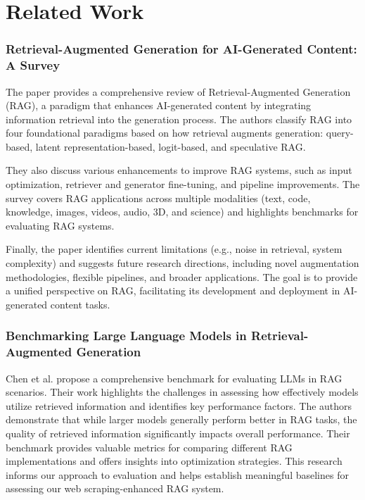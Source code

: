 \documentclass[fleqn,moreauthors,10pt]{ds_report}
\begin{document}
\textbf{}

\section*{Related Work}

\subsubsection{Retrieval-Augmented Generation for AI-Generated Content: A Survey}
The paper provides a comprehensive review of Retrieval-Augmented Generation (RAG), a paradigm that enhances AI-generated content by integrating information retrieval into the generation process. The authors classify RAG into four foundational paradigms based on how retrieval augments generation: query-based, latent representation-based, logit-based, and speculative RAG. 

They also discuss various enhancements to improve RAG systems, such as input optimization, retriever and generator fine-tuning, and pipeline improvements. The survey covers RAG applications across multiple modalities (text, code, knowledge, images, videos, audio, 3D, and science) and highlights benchmarks for evaluating RAG systems.

Finally, the paper identifies current limitations (e.g., noise in retrieval, system complexity) and suggests future research directions, including novel augmentation methodologies, flexible pipelines, and broader applications. The goal is to provide a unified perspective on RAG, facilitating its development and deployment in AI-generated content tasks. \cite{zhao2024}

\subsubsection{Benchmarking Large Language Models in Retrieval-Augmented Generation}
Chen et al. propose a comprehensive benchmark for evaluating LLMs in RAG scenarios. Their work highlights the challenges in assessing how effectively models utilize retrieved information and identifies key performance factors. The authors demonstrate that while larger models generally perform better in RAG tasks, the quality of retrieved information significantly impacts overall performance. Their benchmark provides valuable metrics for comparing different RAG implementations and offers insights into optimization strategies. This research informs our approach to evaluation and helps establish meaningful baselines for assessing our web scraping-enhanced RAG system. \cite{chen2024}
\end{document}
